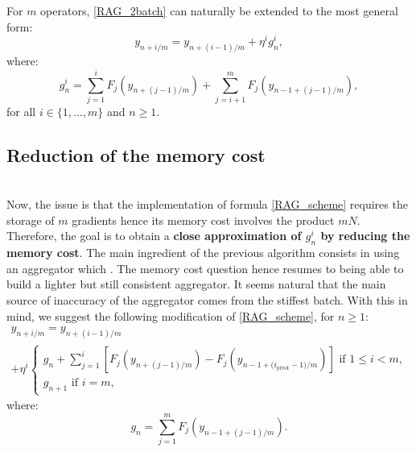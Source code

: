 \documentclass[article,authoryear,jmlmc]{beg_32}             %
\begin{document}
For $m$ operators, \eqref{RAG_2batch} can naturally be extended to the most general form:
\begin{equation}
	y_{n+i/m} = y_{n+(i-1)/m}+\eta^i g_n^i,
	\label{RAG_scheme}
\end{equation}
where:
\begin{equation}
	g_n^i = \sum_{j=1}^i F_j\left(y_{n+(j-1)/m}\right)+\sum_{j=i+1}^m F_j\left(y_{n-1+(j-1)/m}\right),
	\label{gni}
\end{equation}
for all $i \in \{1,\dots,m\}$ and $n\geq 1$. 

\subsection{Reduction of the memory cost}
\label{red_mem}
~~\\
Now, the issue is that the implementation of formula \eqref{RAG_scheme} requires the storage of $m$ gradients hence its memory cost involves the product $mN$. Therefore, the goal is to obtain a \textbf{close approximation of $g_n^i$ by reducing the memory cost}.
The main ingredient of the previous algorithm consists in using an aggregator which .
The memory cost question hence resumes to being able to build a lighter but still consistent aggregator.
It seems natural that the main source of inaccuracy of the aggregator comes from the stiffest batch. 
With this in mind, we suggest the following modification of \eqref{RAG_scheme}, for $n\geq 1$:
\begin{multline}
	y_{n+i/m} = y_{n+(i-1)/m} \\
	+\eta^i
	\left\{
	\begin{array}{ll}
          g_n+\displaystyle{\sum_{j=1}^i} \left[F_j\left(y_{n+(j-1)/m}\right)-F_j\left(y_{{n-1+(i_{\text{pivot}}-1})/m}\right)\right] \text{ if } 1\leq i<m,\\
		g_{n+1} \text{ if } i=m,
	\end{array}
	\right.
	\label{RAGL_splitting}
\end{multline}
where:
\begin{equation*}
	g_n = \sum_{j=1}^m F_j\left(y_{n-1+(j-1)/m}\right).
\end{equation*}
\end{document}
